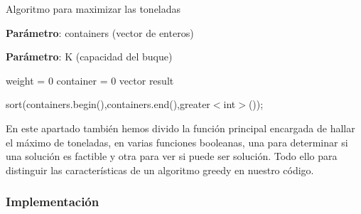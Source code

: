 \begin{algorithm}[H]
    \caption{Algoritmo para maximizar las toneladas}\label{alg:max_toneladas}
    \begin{minipage}{0.92\textwidth}

    \textbf{Parámetro}: containers (vector de enteros)

    \textbf{Parámetro}: K (capacidad del buque)

    \end{minipage}

    weight = 0\;
	container = 0\;
    vector result\;
  
    sort(containers.begin(),containers.end(),greater$<$int$>$());

  

\end{algorithm}

En este apartado también hemos divido la función principal encargada de hallar el máximo de toneladas, en varias funciones
booleanas, una para determinar si una solución es factible y otra para ver si puede ser solución. Todo ello para distinguir 
las características de un algoritmo greedy en nuestro código.

\subsubsection{Implementación}

